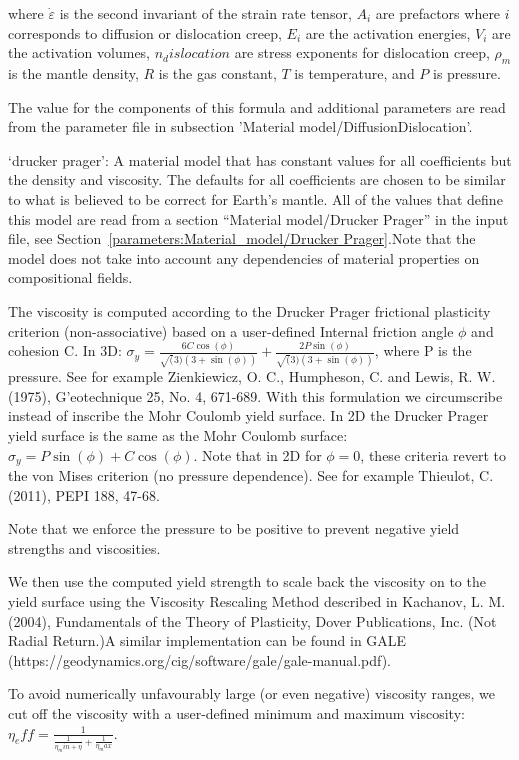\begin{itemize}
 where $\dot{\varepsilon}$ is the second invariant of the strain rate tensor, $A_i$ are prefactors where $i$ corresponds to diffusion or dislocation creep, $E_i$ are the activation energies, $V_i$ are the activation volumes, $n_dislocation$ are stress exponents for dislocation creep, $\rho_m$ is the mantle density, $R$ is the gas constant, $T$ is temperature, and $P$ is pressure. 

 The value for the components of this formula and additional parameters are read from the parameter file in subsection 'Material model/DiffusionDislocation'.

`drucker prager': A material model that has constant values for all coefficients but the density and viscosity. The defaults for all coefficients are chosen to be similar to what is believed to be correct for Earth's mantle. All of the values that define this model are read from a section ``Material model/Drucker Prager'' in the input file, see Section~\ref{parameters:Material_model/Drucker Prager}.Note that the model does not take into account any dependencies of material properties on compositional fields. 

The viscosity is computed according to the Drucker Prager frictional plasticity criterion (non-associative) based on a user-defined Internal friction angle $\phi$ and cohesion C. In 3D:  $\sigma_y = \frac{6 C \cos(\phi)}{\sqrt(3) (3+\sin(\phi))} + \frac{2 P \sin(\phi)}{\sqrt(3) (3+\sin(\phi))}$, where P is the pressure. See for example Zienkiewicz, O. C., Humpheson, C. and Lewis, R. W. (1975), G'{e}otechnique 25, No. 4, 671-689. With this formulation we circumscribe instead of inscribe the Mohr Coulomb yield surface. In 2D the Drucker Prager yield surface is the same as the Mohr Coulomb surface:  $\sigma_y = P \sin(\phi) + C \cos(\phi)$. Note that in 2D for $\phi=0$, these criteria revert to the von Mises criterion (no pressure dependence). See for example Thieulot, C. (2011), PEPI 188, 47-68. 

Note that we enforce the pressure to be positive to prevent negative yield strengths and viscosities. 

We then use the computed yield strength to scale back the viscosity on to the yield surface using the Viscosity Rescaling Method described in Kachanov, L. M. (2004), Fundamentals of the Theory of Plasticity, Dover Publications, Inc. (Not Radial Return.)A similar implementation can be found in GALE (https://geodynamics.org/cig/software/gale/gale-manual.pdf). 

To avoid numerically unfavourably large (or even negative) viscosity ranges, we cut off the viscosity with a user-defined minimum and maximum viscosity: $\eta_eff = \frac{1}{\frac{1}{\eta_min + \eta}+ \frac{1}{\eta_max}}$. 


\end{itemize}
